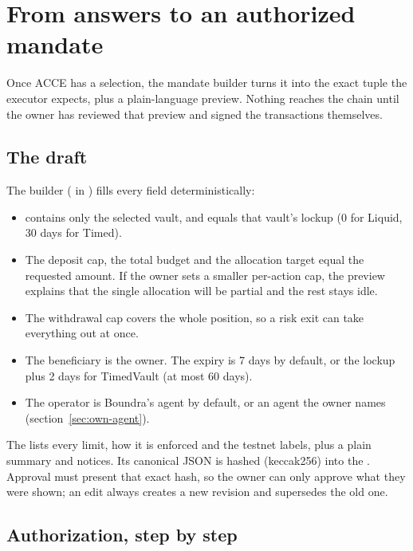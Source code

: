 \chapter{From answers to an authorized mandate}\label{ch:mandates}

Once ACCE has a selection, the mandate builder turns it into the exact tuple the executor expects, plus a plain-language preview. Nothing reaches the chain until the owner has reviewed that preview and signed the transactions themselves.

\section{The draft}

The builder ( in ) fills every field deterministically:

\begin{itemize}
  \item {} contains only the selected vault, and  equals that vault's lockup (0 for Liquid, 30 days for Timed).
  \item The deposit cap, the total budget and the allocation target equal the requested amount. If the owner sets a smaller per-action cap, the preview explains that the single allocation will be partial and the rest stays idle.
  \item The withdrawal cap covers the whole position, so a risk exit can take everything out at once.
  \item The beneficiary is the owner. The expiry is 7 days by default, or the lockup plus 2 days for TimedVault (at most 60 days).
  \item The operator is Boundra's agent by default, or an agent the owner names (section~\ref{sec:own-agent}).
\end{itemize}

The  lists every limit, how it is enforced and the testnet labels, plus a plain summary and notices. Its canonical JSON is hashed (keccak256) into the . Approval must present that exact hash, so the owner can only approve what they were shown; an edit always creates a new revision and supersedes the old one.

\section{Authorization, step by step}

